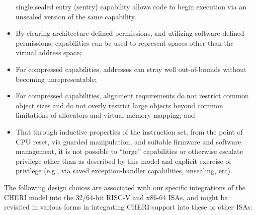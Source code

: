 \begin{itemize}
  single sealed entry (sentry) capability allows code to begin execution via
  an unsealed version of the same capability.
\item By clearing architecture-defined permissions, and utilizing software-defined
  permissions, capabilities can be used to represent spaces other than the
  virtual address space;
\item For compressed capabilities, addresses can stray well out-of-bounds
  without becoming unrepresentable;
\item For compressed capabilities, alignment requirements do not
  restrict common object sizes and do not overly restrict large objects beyond
  common limitations of allocators and virtual memory mapping; and
\item That through inductive properties of the instruction set, from the
  point of CPU reset, via guarded manipulation, and suitable firmware and
  software management, it is not possible to ``forge'' capabilities or
  otherwise escalate privilege other than as described by this model and
  explicit exercise of privilege (e.g., via saved exception-handler
  capabilities, unsealing, etc).
\end{itemize}

The following design choices are associated with our specific integrations of
the CHERI model into the 32/64-bit RISC-V and x86-64 ISAs, and might be
revisited in various forms in integrating CHERI support into these or other
ISAs:

